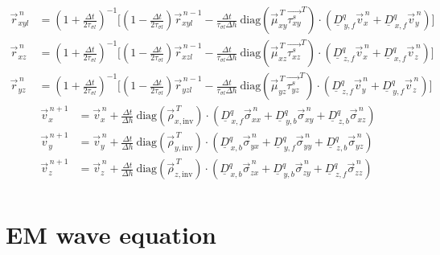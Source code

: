 \documentclass[pdftex,a4paper,parskip,listof=totoc,bibliography=totoc,onehalfspacing,12pt]{scrreprt}
\begin{document}
\begin{align*}
	\vec{r}_{xyl}^{\,n} &= \left( 1+\frac{\Delta t}{2 \tau_{\sigma l}} \right)^{-1} \Bigg[ \left( 1-\frac{\Delta t}{2 \tau_{\sigma l}} \right) \vec{r}_{xyl}^{\,n-1} - \frac{\Delta t}{\tau_{\sigma l} \Delta h} ~\mathrm{diag} \left( \vec{\mu}_{xy}^{\,T} \vec{\tau^s_{xy}}^{T} \right) \cdot \left( \underline{D}_{\,y,f}^q \vec{v}_x^{\,n} + \underline{D}_{\,x,f}^q \vec{v}_y^{\,n} \right) \Bigg]\\
	\vec{r}_{xz}^{\,n} &= \left( 1+\frac{\Delta t}{2 \tau_{\sigma l}} \right)^{-1} \Bigg[ \left( 1-\frac{\Delta t}{2 \tau_{\sigma l}} \right) \vec{r}_{xzl}^{\,n-1} - \frac{\Delta t}{\tau_{\sigma l} \Delta h} ~\mathrm{diag} \left( \vec{\mu}_{xz}^{\,T} \vec{\tau_{xz}^s}^{T} \right) \cdot \left( \underline{D}_{\,z,f}^q \vec{v}_x^{\,n} + \underline{D}_{\,x,f}^q \vec{v}_z^{\,n} \right) \Bigg]\\
	\vec{r}_{yz}^{\,n} &= \left( 1+\frac{\Delta t}{2 \tau_{\sigma l}} \right)^{-1} \Bigg[ \left( 1-\frac{\Delta t}{2 \tau_{\sigma l}} \right) \vec{r}_{yzl}^{\,n-1} - \frac{\Delta t}{\tau_{\sigma l} \Delta h} ~\mathrm{diag} \left( \vec{\mu}_{yz}^{\,T} \vec{\tau_{yz}^s}^{T} \right) \cdot \left( \underline{D}_{\,z,f}^q \vec{v}_y^{\,n} + \underline{D}_{\,y,f}^q \vec{v}_z^{\,n} \right) \Bigg]
\end{align*}
\begin{align*}
	\vec{v}_x^{\,n+1} &= \vec{v}_x^{\,n} + \frac{\Delta t}{\Delta h} ~ \mathrm{diag} \left( \vec{\rho}_{x,\mathrm{inv}}^{\,T} \right) \cdot \left( \underline{D}_{\,x,f}^q \vec{\sigma}_{xx}^{\,n} + \underline{D}_{\,y,b}^q \vec{\sigma}_{xy}^{\,n} + \underline{D}_{\,z,b}^q \vec{\sigma}_{xz}^{\,n} \right)\\
	\vec{v}_y^{\,n+1} &= \vec{v}_y^{\,n} + \frac{\Delta t}{\Delta h} ~ \mathrm{diag} \left( \vec{\rho}_{y,\mathrm{inv}}^{\,T} \right) \cdot \left( \underline{D}_{\,x,b}^q \vec{\sigma}_{yx}^{\,n} + \underline{D}_{\,y,f}^q \vec{\sigma}_{yy}^{\,n} + \underline{D}_{\,z,b}^q \vec{\sigma}_{yz}^{\,n} \right)\\
	\vec{v}_z^{\,n+1} &= \vec{v}_z^{\,n} + \frac{\Delta t}{\Delta h} ~ \mathrm{diag} \left( \vec{\rho}_{z,\mathrm{inv}}^{\,T} \right) \cdot \left( \underline{D}_{\,x,b}^q \vec{\sigma}_{zx}^{\,n} + \underline{D}_{\,y,b}^q \vec{\sigma}_{zy}^{\,n} + \underline{D}_{\,z,f}^q \vec{\sigma}_{zz}^{\,n} \right)\\
\end{align*}

\chapter{EM wave equation}
\label{sec:Visco_EM_wave_equation}
\end{document}
